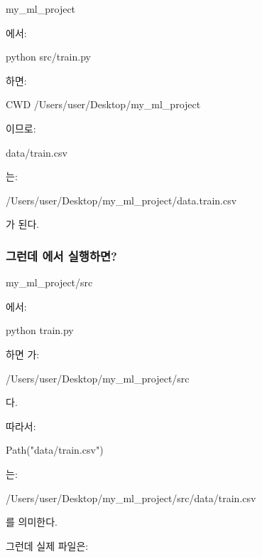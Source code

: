 \begin{dhkzsh}
my_ml_project %
\end{dhkzsh}

에서:

\begin{dhkzsh}
python src/train.py
\end{dhkzsh}

하면:

\begin{dhkzsh}
CWD
/Users/user/Desktop/my_ml_project
\end{dhkzsh}

이므로:

\begin{dhkzsh}
data/train.csv
\end{dhkzsh}

는:

\begin{dhkzsh}
/Users/user/Desktop/my_ml_project/data.train.csv
\end{dhkzsh}

가 된다.

\subsubsection{그런데 에서 실행하면?}

\begin{dhkzsh}
my_ml_project/src %
\end{dhkzsh}

에서:

\begin{dhkzsh}
python train.py
\end{dhkzsh}

하면 가:

\begin{dhkzsh}
/Users/user/Desktop/my_ml_project/src
\end{dhkzsh}

다.

따라서:

\begin{dhkcode}
Path("data/train.csv")
\end{dhkcode}

는:

\begin{dhkzsh}
/Users/user/Desktop/my_ml_project/src/data/train.csv
\end{dhkzsh}

를 의미한다.

그런데 실제 파일은:

